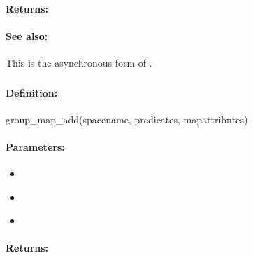 \paragraph{Returns:}


\paragraph{See also:}  This is the asynchronous form of .

\pagebreak
\subsubsection{}
\label{api:ruby:group_map_add}


\paragraph{Definition:}
\begin{rubycode}
group_map_add(spacename, predicates, mapattributes)
\end{rubycode}

\paragraph{Parameters:}
\begin{itemize}[noitemsep]
\item {}\\

\item {}\\

\item {}\\

\end{itemize}

\paragraph{Returns:}


\pagebreak
\subsubsection{}
\label{api:ruby:async_group_map_add}


